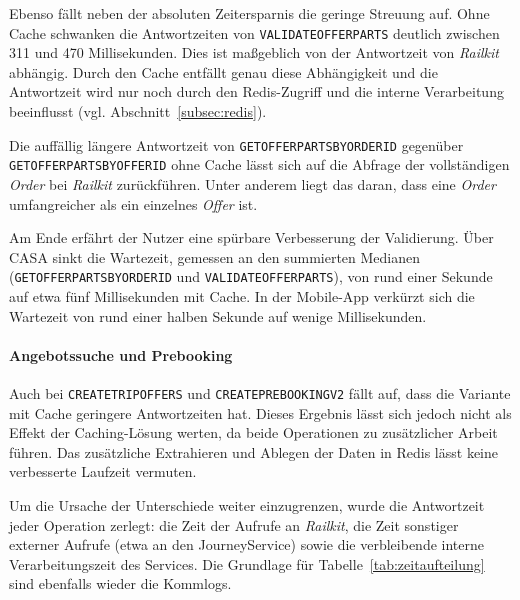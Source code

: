 Ebenso fällt neben der absoluten Zeitersparnis die geringe Streuung auf. Ohne Cache schwanken die Antwortzeiten von \texttt{VALIDATEOFFERPARTS} deutlich zwischen 311 und 470 Millisekunden. Dies ist maßgeblich von der Antwortzeit von \textit{Railkit} abhängig. Durch den Cache entfällt genau diese Abhängigkeit und die Antwortzeit wird nur noch durch den Redis-Zugriff und die interne Verarbeitung beeinflusst (vgl. Abschnitt~\ref{subsec:redis}).

Die auffällig längere Antwortzeit von
\texttt{GETOFFERPARTSBYORDERID} gegenüber \texttt{GETOFFERPARTSBYOFFERID} ohne Cache lässt sich auf die Abfrage der vollständigen \textit{Order} bei \textit{Railkit} zurückführen. Unter anderem liegt das daran, dass eine \textit{Order} umfangreicher als ein einzelnes \textit{Offer} ist.

Am Ende erfährt der Nutzer eine spürbare Verbesserung der Validierung. Über CASA sinkt die Wartezeit, gemessen an den summierten Medianen (\texttt{GETOFFERPARTSBYORDERID} und
\texttt{VALIDATEOFFERPARTS}), von rund einer Sekunde auf etwa fünf Millisekunden mit Cache. In der Mobile-App verkürzt sich die Wartezeit von rund einer halben Sekunde auf wenige Millisekunden.

\paragraph{Angebotssuche und Prebooking}
Auch bei \texttt{CREATETRIPOFFERS} und \texttt{CREATEPREBOOKINGV2} fällt auf, dass die Variante mit Cache geringere Antwortzeiten hat. Dieses Ergebnis lässt sich jedoch nicht als Effekt der Caching-Lösung werten, da beide Operationen zu zusätzlicher Arbeit führen. Das zusätzliche Extrahieren und Ablegen der Daten in Redis lässt keine verbesserte Laufzeit vermuten.

Um die Ursache der Unterschiede weiter einzugrenzen, wurde die Antwortzeit jeder Operation zerlegt: die Zeit der Aufrufe an \textit{Railkit}, die Zeit sonstiger externer Aufrufe (etwa an den JourneyService) sowie die verbleibende interne Verarbeitungszeit des Services. Die Grundlage für Tabelle~\ref{tab:zeitaufteilung} sind ebenfalls wieder die Kommlogs.

